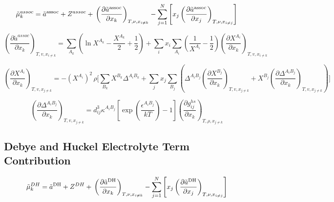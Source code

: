 \documentclass[12pt, letterpaper]{article}
\begin{document}
\cite{Chapman1990}

\begin{equation}
\tilde{\mu}^{assoc}_k = \tilde{a}^{\mathrm{assoc}} + Z^{assoc} + \\\left(\frac{\partial\tilde{a}^{\mathrm{assoc}}}{\partial x_{k}}\right)_{T,\nu,x_{i\neq k}}-\sum_{j=1}^{N}\left[x_{j}\left(\frac{\partial\tilde{a}^{\mathrm{assoc}}}{\partial x_{j}}\right)_{T,\nu,x_{i\neq j}}\right]
\end{equation}

\begin{equation}
\left(\frac{\partial \tilde a^{assoc}}{\partial x_k}\right)_{T,v,x_{i\neq k}}
=
\sum_{A_k}\left(\ln X^{A_k}-\frac{X^{A_k}}{2}+\frac{1}{2}\right)
+
\sum_i x_i\sum_{A_i}
\left(\frac{1}{X^{A_i}}-\frac{1}{2}\right)
\left(\frac{\partial X^{A_i}}{\partial x_k}\right)_{T,v,x_{i\neq k}}
\end{equation}

\begin{equation}
\left(\frac{\partial X^{A_i}}{\partial x_k}\right)_{T,v,x_{j\neq k}}
=
-(X^{A_i})^{2}\,\rho
\Bigg[
\sum_{B_k}X^{B_k}\Delta^{A_iB_k}
+
\sum_{j}x_j\sum_{B_j}
\left(
\Delta^{A_iB_j}\left(\frac{\partial X^{B_j}}{\partial x_k}\right)_{T,v,x_{j\neq k}}
+
X^{B_j}\left(\frac{\partial \Delta^{A_iB_j}}{\partial x_k}\right)_{T,v,x_{j\neq k}}
\right)
\Bigg]
\end{equation}

\begin{equation}
\left(\frac{\partial \Delta^{A_iB_j}}{\partial x_k}\right)_{T,v,x_{j\neq k}}
=
d_{ij}^{3}\kappa^{A_iB_j}
\left[\exp\!\left(\frac{\epsilon^{A_iB_j}}{kT}\right)-1\right]
\left(\frac{\partial g_{ij}^{hs}}{\partial x_k}\right)_{T,\rho,x_{j\neq k}}
\end{equation}

\subsection{Debye and Huckel Electrolyte Term Contribution}

\cite{Bulow2021a}

\begin{equation}
\tilde{\mu}^{DH}_k = \tilde{a}^{\mathrm{DH}} + Z^{DH} + \\\left(\frac{\partial\tilde{a}^{\mathrm{DH}}}{\partial x_{k}}\right)_{T,\nu,x_{i\neq k}}-\sum_{j=1}^{N}\left[x_{j}\left(\frac{\partial\tilde{a}^{\mathrm{DH}}}{\partial x_{j}}\right)_{T,\nu,x_{i\neq j}}\right]
\end{equation}
\end{document}
